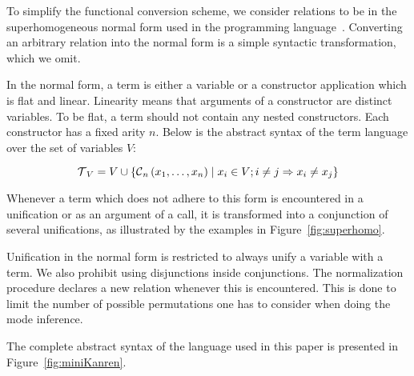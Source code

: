To simplify the functional conversion scheme, we consider \mk relations to be in the superhomogeneous normal form used in the \merc programming language~\cite{somogyi1996execution}.
Converting an arbitrary \mk relation into the normal form is a simple syntactic transformation, which we omit.

In the normal form, a term is either a variable or a constructor application which is flat and linear.
Linearity means that arguments of a constructor are distinct variables.
To be flat, a term should not contain any nested constructors.
Each constructor has a fixed arity $n$.
Below is the abstract syntax of the term language over the set of variables $V$:

\[  \operatorname{\mathcal{T}}_{V} = V \cup \{\operatorname{\mathcal{C}}_{n}\left( x_1, \ldots, x_{n} \right) \mid x_{i}\in V; i \neq j \Rightarrow x_i \neq x_j\} \]


Whenever a term which does not adhere to this form is encountered in a unification or as an argument of a call, it is transformed into a conjunction of several unifications, as illustrated by the examples in Figure~\ref{fig:superhomo}.

Unification in the normal form is restricted to always unify a variable with a term.
We also prohibit using disjunctions inside conjunctions.
The normalization procedure declares a new relation whenever this is encountered.
This is done to limit the number of possible permutations one has to consider when doing the mode inference.

The complete abstract syntax of the \mk language used in this paper is presented in Figure~\ref{fig:miniKanren}.
